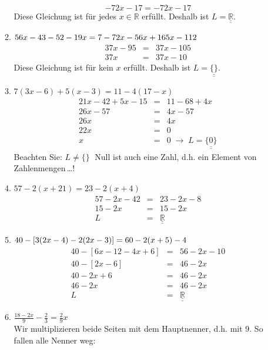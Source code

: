 \documentclass[%
11pt,%
twoside,%
titlepage,%
german,%
]{scrartcl}
\newcommand{\result}[1]{\underline{\underline{#1}}}
\begin{document}
\begin{enumerate}
\begin{enumerate}
    \begin{displaymath}
      -72x - 17 = -72x - 17
    \end{displaymath}
    Diese Gleichung ist f\"ur jedes $x\in\mathbb{R}$ erf\"ullt. Deshalb ist $L=\result{\mathbb{R}}$.
  \item $\displaystyle 56x-43-52-19x \\ =7-72x-56x+165x-112$
    \begin{eqnarray*}
      37x - 95 & = & 37x -105 \\
      37x & = & 37x - 10
    \end{eqnarray*}
    Diese Gleichung ist f\"ur kein $x$ erf\"ullt. Deshalb ist $L=\result{\{\}}$.
  \item $\displaystyle 7(3x-6)+5(x-3)=11-4(17-x)$
    \begin{eqnarray*}
      21x - 42 + 5x - 15 & = & 11 - 68 + 4x \\
      26x - 57 & = & 4x - 57 \\
      26x & = & 4x \\
      22x & = & 0 \\
      x & = & 0 \;\to\; L=\result{\{0\}}
    \end{eqnarray*}
    Beachten Sie: $L \neq \{\}\;$ Null ist auch eine Zahl, d.h. ein Element von Zahlenmengen\,\ldots!
  \item $\displaystyle 57-2(x+21)=23-2(x+4)$
    \begin{eqnarray*}
      57 - 2x - 42 & = & 23 - 2x - 8 \\
      15 - 2x & = & 15 - 2x \\
      L & = & \result{\mathbb{R}}
    \end{eqnarray*}
  \item $\displaystyle 40-[3(2x-4)-2(2x-3)] \\ =60-2(x+5)-4$
    \begin{eqnarray*}
      40 - [6x-12-4x+6] & = & 56 - 2x - 10 \\
      40 - [2x-6] & = & 46 - 2x \\
      40 - 2x + 6 & = & 46 - 2x \\
      46 - 2x & = & 46 - 2x \\
      L & = & \result{\mathbb{R}}
    \end{eqnarray*}
  \item $\displaystyle \frac{18-2x}{9}-\frac{2}{3}=\frac{2}{9}x$ \\
    Wir multiplizieren beide Seiten mit dem Hauptnenner, d.h. mit 9. So fallen alle Nenner weg:
    \begin{eqnarray*}

\end{eqnarray*}
\end{enumerate}
\end{enumerate}
\end{document}

